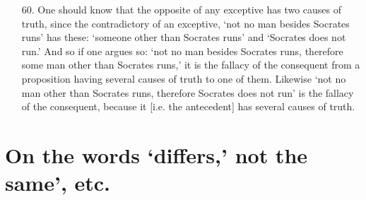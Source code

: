 \documentclass[]{article}
\begin{document}
\begin{itemize}
\item[60.] One should know that the opposite of any exceptive has two causes of truth, since the contradictory of an exceptive, `not no man besides Socrates runs' has these: `someone other than Socrates runs' and `Socrates does not run.' And so if one argues so: `not no man besides Socrates runs, therefore some man other than Socrates runs,' it is the fallacy of the consequent from a proposition having several causes of truth to one of them. Likewise `not no man other than Socrates runs, therefore Socrates does not run' is the fallacy of the consequent, because it [i.e. the antecedent] has several causes of truth.
\end{itemize} 
\section{On the words `differs,' not the same', etc.}
\end{document}
